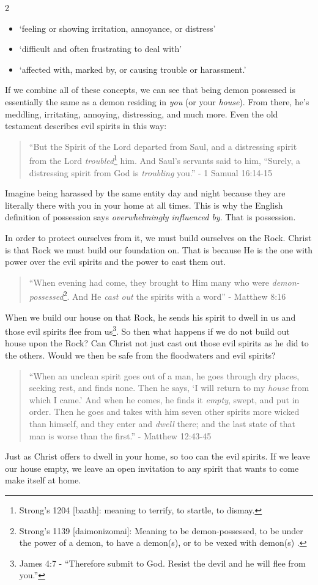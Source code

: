 \documentclass[10pt]{article}
\begin{document}
\begin{multicols}{2}
\begin{itemize}
	\setlength\itemsep{0em}
	\item `feeling or showing irritation, annoyance, or distress'
	\item `difficult and often frustrating to deal with'
	\item  `affected with, marked by, or causing trouble or harassment.'
\end{itemize}
If we combine all of these concepts, we can see that being demon possessed is essentially the same as a demon residing in \textit{you} (or your \textit{house}). From there, he's meddling, irritating, annoying, distressing, and much more. Even the old testament describes evil spirits in this way:
\begin{quotation}
``But the Spirit of the Lord departed from Saul, and a distressing spirit from the Lord \textit{troubled}\footnote{Strong's 1204 [baath]: meaning to terrify, to startle, to dismay.} him. And Saul’s servants said to him, “Surely, a distressing spirit from God is \textit{troubling} you.'' - 1 Samual 16:14-15
\end{quotation}
Imagine being harassed by the same entity day and night because they are literally there with you in your home at all times. This is why the English definition of possession says \textit{overwhelmingly influenced by}. That is possession.

In order to protect ourselves from it, we must build ourselves on the Rock. Christ is that Rock we must build our foundation on. That is because He is the one with power over the evil spirits and the power to cast them out. 
\begin{quotation}
``When evening had come, they brought to Him many who were \textit{demon-possessed}\footnote{Strong's 1139 [daimonizomai]: Meaning to be demon-possessed, to be under the power of a demon, to have a demon(s), or to be vexed with demon(s) \cite{Bible Hub}.}. And He \textit{cast out} the spirits with a word'' - Matthew 8:16
\end{quotation}
When we build our house on that Rock, he sends his spirit to dwell in us and those evil spirits flee from us\footnote{James 4:7 - ``Therefore submit to God. Resist the devil and he will flee from you.''}. So then what happens if we do not build out house upon the Rock? Can Christ not just cast out those evil spirits as he did to the others. Would we then be safe from the floodwaters and evil spirits?
\begin{quotation}
``When an unclean spirit goes out of a man, he goes through dry places, seeking rest, and finds none. Then he says, ‘I will return to my \textit{house} from which I came.’ And when he comes, he finds it \textit{empty}, swept, and put in order.  Then he goes and takes with him seven other spirits more wicked than himself, and they enter and \textit{dwell} there; and the last state of that man is worse than the first.'' - Matthew 12:43-45
\end{quotation}
Just as Christ offers to dwell in your home, so too can the evil spirits. If we leave our house empty, we leave an open invitation to any spirit that wants to come make itself at home. 


\end{multicols}
\end{document}
